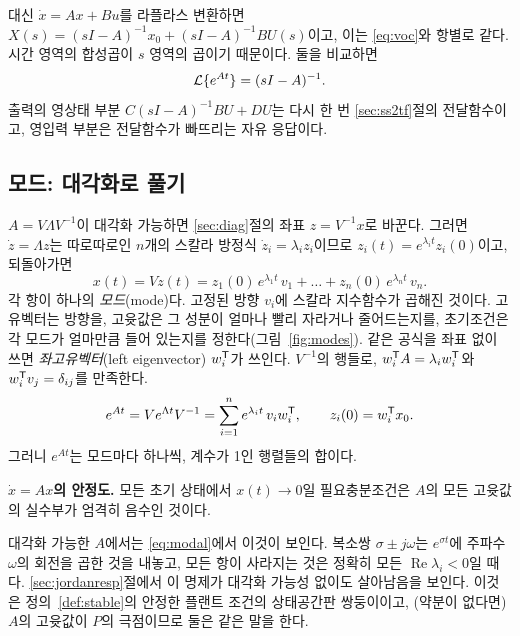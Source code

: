 \documentclass[11pt]{article}
\begin{document}
대신 $\dot x=Ax+Bu$를 라플라스 변환하면
$X(s)=(sI-A)^{-1}x_0+(sI-A)^{-1}BU(s)$이고, 이는 \eqref{eq:voc}와 항별로 같다.
시간 영역의 합성곱이 $s$ 영역의 곱이기 때문이다. 둘을 비교하면
\begin{equation}\label{eq:laplaceexpm}
   \mathcal{L}\{e^{At}\} = (sI-A)^{-1}.
\end{equation}
출력의 영상태 부분 $C(sI-A)^{-1}BU+DU$는 다시 한 번 \ref{sec:ss2tf}절의
전달함수이고, 영입력 부분은 전달함수가 빠뜨리는 자유 응답이다.

\subsection{모드: 대각화로 풀기}\label{sec:modes}
$A=V\Lambda V^{-1}$이 대각화 가능하면 \ref{sec:diag}절의 좌표 $z=V^{-1}x$로
바꾼다. 그러면 $\dot z=\Lambda z$는 따로따로인 $n$개의 스칼라 방정식
$\dot z_i=\lambda_iz_i$이므로 $z_i(t)=e^{\lambda_it}z_i(0)$이고, 되돌아가면
\begin{equation}\label{eq:modal}
   x(t) = Vz(t) = z_1(0)\,e^{\lambda_1t}\,v_1 + \dots + z_n(0)\,e^{\lambda_nt}\,v_n .
\end{equation}
각 항이 하나의 \emph{모드}(mode)다. 고정된 방향 $v_i$에 스칼라 지수함수가 곱해진
것이다. 고유벡터는 방향을, 고윳값은 그 성분이 얼마나 빨리 자라거나 줄어드는지를,
초기조건은 각 모드가 얼마만큼 들어 있는지를 정한다(그림~\ref{fig:modes}). 같은
공식을 좌표 없이 쓰면 \emph{좌고유벡터}(left eigenvector) $w_i^{\mathsf{T}}$가 쓰인다.
$V^{-1}$의 행들로, $w_i^{\mathsf{T}} A=\lambda_iw_i^{\mathsf{T}}$와 $w_i^{\mathsf{T}} v_j=\delta_{ij}$를
만족한다.
\begin{equation}\label{eq:expmdyad}
   e^{At} = Ve^{\Lambda t}V^{-1} = \sum_{i=1}^{n} e^{\lambda_it}\,v_iw_i^{\mathsf{T}} ,
   \qquad z_i(0) = w_i^{\mathsf{T}} x_0 .
\end{equation}
그러니 $e^{At}$는 모드마다 하나씩, 계수가 1인 행렬들의 합이다.

\begin{keybox}
\textbf{$\dot x=Ax$의 안정도.} 모든 초기 상태에서 $x(t)\to0$일 필요충분조건은 $A$의
모든 고윳값의 실수부가 엄격히 음수인 것이다.
\end{keybox}
대각화 가능한 $A$에서는 \eqref{eq:modal}에서 이것이 보인다. 복소쌍
$\sigma\pm j\omega$는 $e^{\sigma t}$에 주파수 $\omega$의 회전을 곱한 것을 내놓고,
모든 항이 사라지는 것은 정확히 모든 $\operatorname{Re}\lambda_i<0$일 때다.
\ref{sec:jordanresp}절에서 이 명제가 대각화 가능성 없이도 살아남음을 보인다. 이것은
정의~\ref{def:stable}의 안정한 플랜트 조건의 상태공간판 쌍둥이이고, (약분이 없다면)
$A$의 고윳값이 $P$의 극점이므로 둘은 같은 말을 한다.
\end{document}

